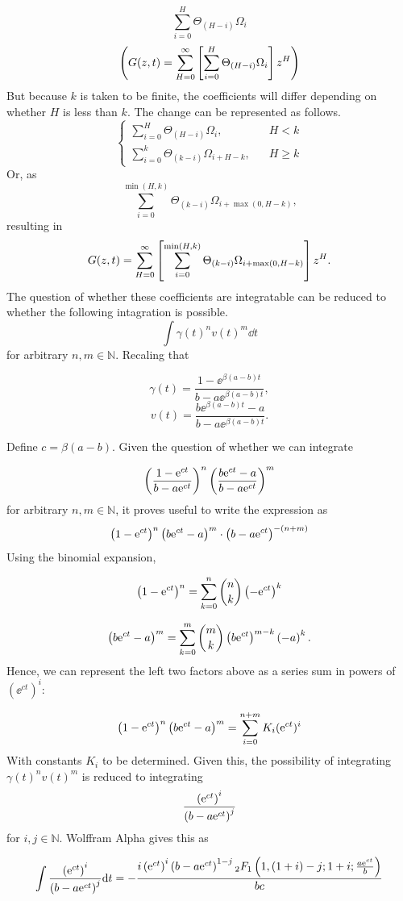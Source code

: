$$\sum^H_{i=0} \Theta_{(H-i)} \Omega_i $$
$$\left( G(z,t) = \sum^\infty_{H=0} \left[\sum^H_{i=0} \Theta_{(H-i)} \Omega_i  \right] z^H   \right)$$
But because $k$ is taken to be finite, the coefficients will differ depending on whether $H$ is less than $k$. The change can be represented as follows.
$$\begin{cases}
\displaystyle
\sum^H_{i=0} \Theta_{(H-i)} \Omega_i ,&  \hspace{10pt} H<k\\
\displaystyle
\sum^k_{i=0} \Theta_{(k-i)} \Omega_{i+H-k}, &  \hspace{10pt}  H\geq k
\end{cases}$$
Or, as 
$$\sum^{\min(H,k)}_{i=0} \Theta_{(k-i)} \Omega_{i+ \max(0,H-k)},$$
resulting in 
$$G(z, t) =  \sum^\infty_{H=0} \left[\sum^{\min(H,k)}_{i=0} \Theta_{(k-i)} \Omega_{i+ \max(0,H-k)}\right] z^H.$$
The question of whether these coefficients are integratable can be reduced to whether the following intagration is possible.
$$\int \gamma(t)^n v(t)^m \dd t $$
for arbitrary $n,m\in \mathbb{N}$. Recaling that 

$$\gamma(t) = \frac{1 - \ee^{\beta(a-b) t}}{b - a \ee^{\beta (a-b) t }},$$
$$    v(t) = \frac{ b \ee^{\beta(a-b) t} - a}{    b - a \ee^{\beta (a-b) t } }.$$



\noindent
Define $c =\beta (a-b)$. Given the question of whether we can integrate 

$$\left(\frac{1 - {\rm e}^{ct}}{b - a {\rm e}^{ct }}  \right)^n  \left( \frac{ b {\rm e}^{c t} - a}{    b - a {\rm e}^{ct } } \right) ^m$$
for arbitrary $n, m \in \mathbb{N}$, it proves useful to write the expression as 
$$\left(1 - {\rm e}^{ct}\right)^n\left( b {\rm e}^{ct} - a\right)^m  \cdot \left(  b - a {\rm e}^{c t }\right)^{-(n+m)}$$
Using the binomial expansion,

$$\left(1 - {\rm e}^{ct}\right)^n  = \sum_{k=0}^n {n\choose k} \left(-{\rm e}^{ct}\right)^k$$

$$\left( b{\rm e}^{ct} - a\right)^m = \sum_{k=0}^m {m\choose k }\left( b {\rm e}^{ct}\right)^{m-k} \left(-a\right)^k.$$
Hence, we can represent the left two factors above as a series sum in powers of $(\ee^{ct})^i$:

$$\left(1 - {\rm e}^{ct}\right)^n\left( b {\rm e}^{ct} - a\right)^m  = \sum_{i=0}^{n+m} K_i ({\rm e}^{ct})^i$$
With constants $K_i$ to be determined. Given this, the possibility of integrating $\gamma(t)^n v(t)^m $ is reduced to integrating 
$$\frac{\left({\rm e}^{ct}\right)^i}{ \left( b - a{\rm e}^{ct}\right)^j  }$$
for $i, j \in \mathbb{N}$. Wolffram Alpha gives this as 

$$\int \frac{\left({\rm e}^{ct}\right) ^i}{\left( b - a{\rm e}^{ct}\right) ^j} {\rm d} t  = -\frac{i \left({\rm e}^{ct}\right)^i  \left( b-a {\rm e}^{ct}\right)^{1-j}    {}_2F_1\left(1, (1+i) - j; 1 + i; \frac{a{\rm e}^{ct}}{b}\right)   }{bc}$$




